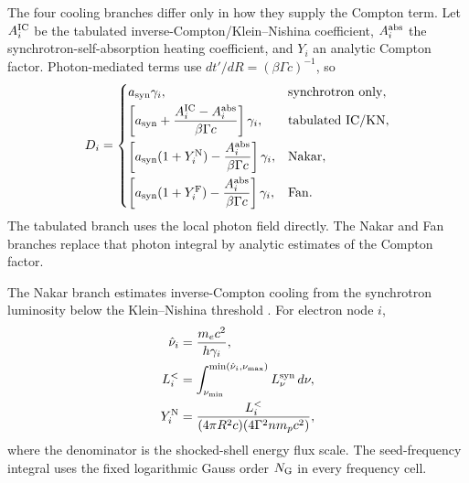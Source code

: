 \documentclass[twocolumn]{aastex702}
\begin{document}
The four cooling branches differ only in how they supply the Compton term.  Let
\(A_i^{\rm IC}\) be the tabulated inverse-Compton/Klein--Nishina coefficient,
\(A_i^{\rm abs}\) the synchrotron-self-absorption heating coefficient, and
\(Y_i\) an analytic Compton factor.  Photon-mediated terms use
\(dt'/dR=(\beta\Gamma c)^{-1}\), so
\begin{equation}
D_i=
\begin{cases}
a_{\rm syn}\gamma_i, & \mathrm{synchrotron\ only},\\[0.6ex]
\left[a_{\rm syn}+
\dfrac{A_i^{\rm IC}-A_i^{\rm abs}}{\beta\Gamma c}
\right]\gamma_i, & \mathrm{tabulated\ IC/KN},\\[2ex]
\left[a_{\rm syn}(1+Y_i^{\rm N})
-\dfrac{A_i^{\rm abs}}{\beta\Gamma c}
\right]\gamma_i, & \mathrm{Nakar},\\[2ex]
\left[a_{\rm syn}(1+Y_i^{\rm F})
-\dfrac{A_i^{\rm abs}}{\beta\Gamma c}
\right]\gamma_i, & \mathrm{Fan}.
\end{cases}
\label{eq:electron-forward-cooling-assembly}
\end{equation}
The tabulated branch uses the local photon field directly.  The Nakar and Fan
branches replace that photon integral by analytic estimates of the Compton
factor.

The Nakar branch estimates inverse-Compton cooling from the synchrotron
luminosity below the Klein--Nishina threshold \citep{NakarAndoSari2009}.  For
electron node \(i\),
\begin{equation}
\begin{aligned}
\hat\nu_i&=\frac{m_e c^2}{h\gamma_i},\\
L_i^{<}&=
\int_{\nu_{\min}}^{\min(\hat\nu_i,\nu_{\max})}
L_\nu^{\rm syn}\,d\nu,\\
Y_i^{\rm N}&=
\frac{L_i^{<}}
{(4\pi R^2 c)(4\Gamma^2 n m_p c^2)},
\end{aligned}
\end{equation}
where the denominator is the shocked-shell energy flux scale.  The seed-frequency
integral uses the fixed logarithmic Gauss order \(N_{\rm G}\) in every frequency
cell.
\end{document}
